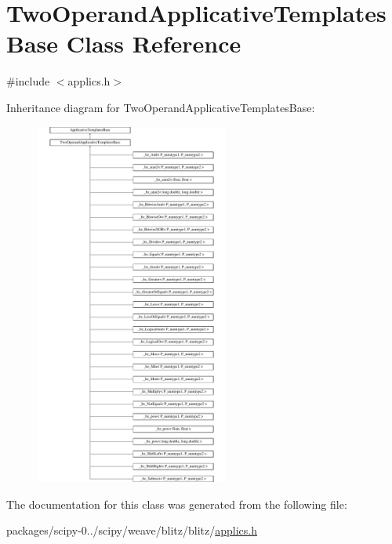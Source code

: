 \hypertarget{classTwoOperandApplicativeTemplatesBase}{}\section{Two\+Operand\+Applicative\+Templates\+Base Class Reference}
\label{classTwoOperandApplicativeTemplatesBase}


{\ttfamily \#include $<$applics.\+h$>$}

Inheritance diagram for Two\+Operand\+Applicative\+Templates\+Base\+:\begin{figure}[H]
\begin{center}
\leavevmode
\includegraphics[height=12.000000cm]{classTwoOperandApplicativeTemplatesBase}
\end{center}
\end{figure}


The documentation for this class was generated from the following file\+:\begin{DoxyCompactItemize}
\item 
packages/scipy-\/0../scipy/weave/blitz/blitz/\hyperlink{applics_8h}{applics.\+h}\end{DoxyCompactItemize}
